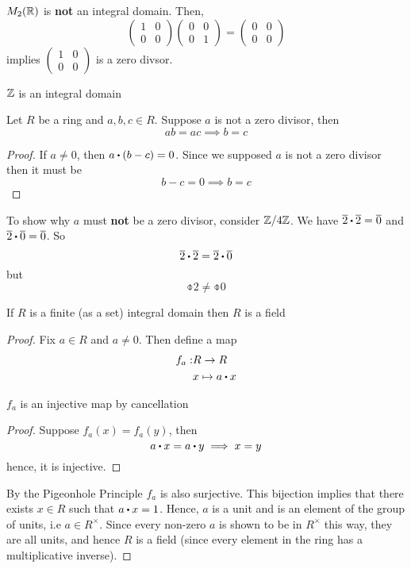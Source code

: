 \documentclass[../Main.tex]{subfiles}
\begin{document}
\begin{example}
	$M_2(\mathbb{R})$ is \textbf{not} an integral domain. Then,
	\[\begin{pmatrix}
	1&0\\0&0
	\end{pmatrix}\begin{pmatrix}
	0&0\\0&1
	\end{pmatrix}=\begin{pmatrix}
	0&0\\0&0
	\end{pmatrix}\]
	implies $\begin{pmatrix}
	1&0\\0&0
	\end{pmatrix}$ is a zero divsor.
\end{example}
\begin{example}
	$\mathbb{Z}$ is an integral domain
\end{example}
\begin{prop}[title=Cancellation Law]
	Let $R$ be a ring and $a,b,c\in R$.\newline
	Suppose $a$ is not a zero divisor, then
		\[ab=ac\implies b=c\]
\end{prop}
\begin{proof}
	If $a\ne0$, then $a\rdot (b-c)=0$. Since we supposed $a$ is not a zero divisor then it must be
	\[b-c=0 \implies b=c\]
\end{proof}
\begin{example}
	To show why $a$ must \textbf{not} be a zero divisor, consider $\mathbb{Z}/4\mathbb{Z}$. We have $\obar{2}\rdot \obar{2}=\obar{0}$ and $\obar{2}\rdot \obar{0}=\obar{0}$. So
	\[\obar{2}\rdot \obar{2}=\obar{2}\rdot \obar{0}\]
	but
	\[\obar{2}\ne \obar{0}\]
\end{example}
\begin{crl}
	If $R$ is a finite (as a set) integral domain then $R$ is a field
\end{crl}
\begin{proof}
	Fix $a\in R$ and $a\ne 0$. Then define a map
	\begin{align*}
		f_a:&R\to R\\
		&x\mapsto a\rdot x
	\end{align*}
	\begin{claim}
		$f_a$ is an injective map by cancellation
	\end{claim}
	\begin{proof}
		Suppose $f_a(x)=f_a(y)$, then
		\[a\rdot x = a\rdot y \implies x=y\]
		hence, it is injective.
	\end{proof}
	By the Pigeonhole Principle $f_a$ is also surjective. This bijection implies that there exists $x\in R$ such that $a\rdot x=1$. Hence, $a$ is a unit and is an element of the group of units, i.e $a\in R^\times$. \newline Since every non-zero $a$ is shown to be in $R^\times$ this way, they are all units, and hence $R$ is a field (since every element in the ring has a multiplicative inverse).
\end{proof}
\end{document}
